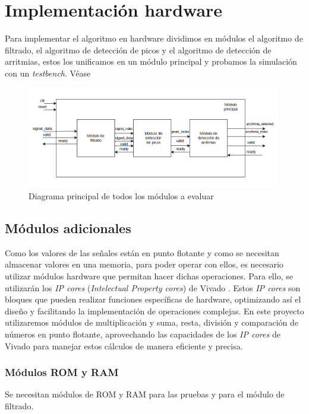 \chapter{Implementación hardware}

Para implementar el algoritmo en hardware dividimos en módulos el algoritmo de filtrado, el algoritmo
de detección de picos y el algoritmo de detección de arritmias, estos los unificamos en un módulo principal 
y probamos la simulación con un \textit{testbench}. Véase 

\begin{figure}[h!]
    \centering
    \includegraphics[width=0.99\textwidth]{./Images/img_res_experimentales/diagramaGeneral.png}
    \caption{Diagrama principal de todos los módulos a evaluar}
    \label{fig:diagramaGeneral}
\end{figure} 




\section{Módulos adicionales} 

Como los valores de las señales están en punto flotante y como se necesitan almacenar valores en una memoria, para poder operar con ellos, es necesario utilizar módulos hardware que permitan hacer dichas operaciones. Para ello, se utilizarán los \textit{IP cores} (\textit{Intelectual Property cores}) de Vivado \cite{xilinx_ip_cores}. Estos \textit{IP cores} son bloques que pueden realizar funciones específicas de hardware, optimizando así el diseño y facilitando la implementación de operaciones complejas. En este proyecto utilizaremos módulos de multiplicación y suma, resta, división y comparación de números en punto flotante, aprovechando las capacidades de los \textit{IP cores} de Vivado para manejar estos cálculos de manera eficiente y precisa.
\subsection{Módulos ROM y RAM}
 Se necesitan módulos de ROM y RAM para las pruebas y para el módulo de filtrado.

